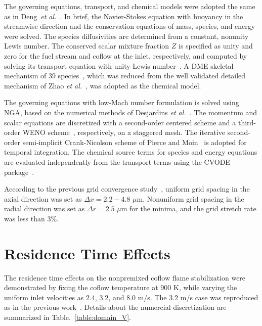 \documentclass{wssci}
\begin{document}
The governing equations, transport, and chemical models were adopted the same as in Deng~\emph{et al.}~\cite{deng15}.  In brief, the Navier-Stokes equation with buoyancy in the streamwise direction and the conservation equations of mass, species, and energy were solved.  The species diffusivities are determined from a constant, nonunity Lewis number.  The conserved scalar mixture fraction $Z$ is specified as unity and zero for the fuel stream and coflow at the inlet, respectively, and computed by solving its transport equation with unity Lewis number~\cite{pitsch98b}.  A DME skeletal mechanism of $39$ species~\cite{bhagatwala15}, which was reduced from the well validated detailed mechanism of Zhao \emph{et al.}~\cite{zhao08}, was adopted as the chemical model.

The governing equations with low-Mach number formulation is solved using NGA, based on the numerical methods of Desjardins \emph{et al.}~\cite{desjardins08}.  The momentum and scalar equations are discretized with a second-order centered scheme and a third-order WENO scheme~\cite{liu94}, respectively, on a staggered mesh.  The iterative second-order semi-implicit Crank-Nicolson scheme of Pierce and Moin~\cite{pierce01} is adopted for temporal integration.  The chemical source terms for species and energy equations are evaluated independently from the transport terms using the CVODE package~\cite{cohen96}.

According to the previous grid convergence study~\cite{deng15}, uniform grid spacing in the axial direction was set as $\Delta x = 2.2-4.8$ $\mu$m.  Nonuniform grid spacing in the radial direction was set as $\Delta r = 2.5$ $\mu$m for the minima, and the grid stretch rate was less than $3$\%.    
\section{Residence Time Effects}

The residence time effects on the nonpremixed coflow flame stabilization were demonstrated by fixing the coflow temperature at $900$ K, while varying the uniform inlet velocities as $2.4$, $3.2$, and $8.0$ m/s.  The $3.2$ m/s case was reproduced as in the previous work~\cite{deng15}.  Details about the numercial discretization are summarized in Table.~\ref{table:domain_V}.

\begin{table}
  \caption{Computational domain and number of grid points.}
  \label{table:domain_V}
  \centering
  \normalsize
\end{table}
\end{document}
